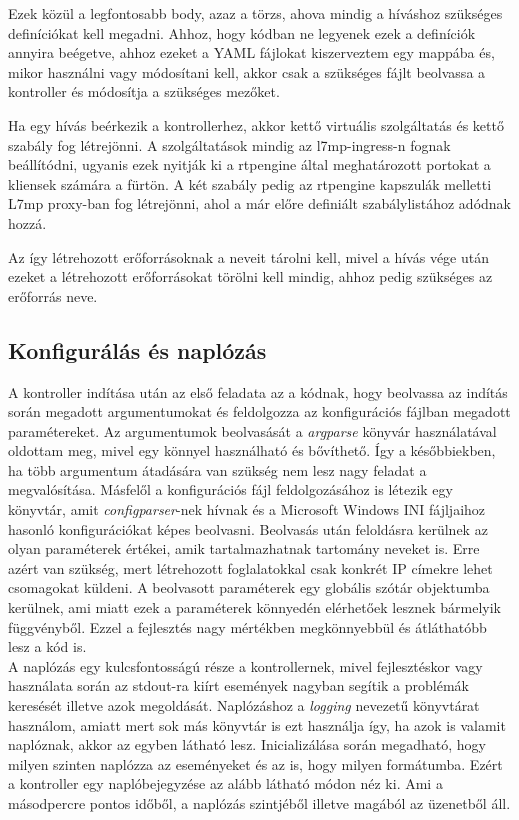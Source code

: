 Ezek közül a legfontosabb body, azaz a törzs, ahova mindig a híváshoz szükséges definíciókat
kell megadni. Ahhoz, hogy kódban ne legyenek ezek a definíciók annyira beégetve, ahhoz
ezeket a YAML fájlokat kiszerveztem egy mappába és, mikor használni vagy módosítani kell,
akkor csak a szükséges fájlt beolvassa a kontroller és módosítja a szükséges mezőket.

Ha egy hívás beérkezik a kontrollerhez, akkor kettő virtuális szolgáltatás és kettő
szabály fog létrejönni. A szolgáltatások mindig az l7mp-ingress-n fognak beállítódni, 
ugyanis ezek nyitják ki a rtpengine által meghatározott portokat a kliensek számára
a fürtön. A két szabály pedig az rtpengine kapszulák melletti L7mp proxy-ban 
fog létrejönni, ahol a már előre definiált szabálylistához adódnak hozzá. 

Az így létrehozott erőforrásoknak a neveit tárolni kell, mivel a hívás vége után ezeket
a létrehozott erőforrásokat törölni kell mindig, ahhoz pedig szükséges az erőforrás 
neve. 

\subsection{Konfigurálás és naplózás}

A kontroller indítása után az első feladata az a kódnak, hogy beolvassa az indítás
során megadott argumentumokat és feldolgozza az konfigurációs fájlban megadott 
paramétereket. Az argumentumok beolvasását a \textit{argparse} \cite{argparse} könyvár használatával
oldottam meg, mivel egy könnyel használható és bővíthető. Így a későbbiekben, ha 
több argumentum átadására van szükség nem lesz nagy feladat a megvalósítása. Másfelől
a konfigurációs fájl feldolgozásához is létezik egy könyvtár, amit \textit{configparser}-nek \cite{configparser}
hívnak és a Microsoft Windows INI fájljaihoz hasonló konfigurációkat képes beolvasni. Beolvasás
után feloldásra kerülnek az olyan paraméterek értékei, amik tartalmazhatnak tartomány neveket
is. Erre azért van szükség, mert létrehozott foglalatokkal csak konkrét IP címekre lehet 
csomagokat küldeni. A beolvasott paraméterek egy globális szótár objektumba kerülnek, ami 
miatt ezek a paraméterek könnyedén elérhetőek lesznek bármelyik függvényből. Ezzel a fejlesztés
nagy mértékben megkönnyebbül és átláthatóbb lesz a kód is. \\

A naplózás egy kulcsfontosságú része a kontrollernek, mivel fejlesztéskor vagy használata
során az stdout-ra kiírt események nagyban segítik a problémák keresését illetve azok 
megoldását. Naplózáshoz a \textit{logging} \cite{logging} nevezetű könyvtárat használom, amiatt mert 
sok más könyvtár is ezt használja így, ha azok is valamit naplóznak, akkor az egyben 
látható lesz. Inicializálása során megadható, hogy milyen szinten naplózza az eseményeket 
és az is, hogy milyen formátumba. Ezért a kontroller egy naplóbejegyzése az alább látható 
módon néz ki. Ami a másodpercre pontos időből, a naplózás szintjéből illetve magából az 
üzenetből áll.

